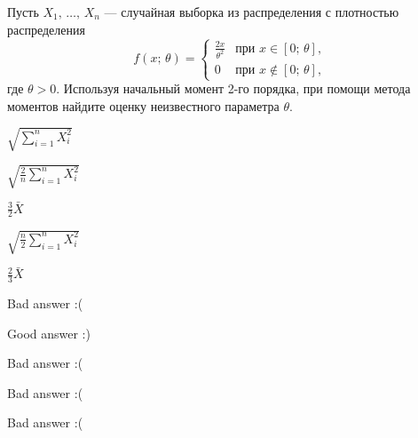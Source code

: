 
\begin{question}
Пусть \(X_1, \, \ldots, \, X_n\) --- случайная выборка из распределения
с плотностью распределения \[
    f(x; \, \theta) = \begin{cases}
                          \frac{2x}{\theta^2} & \text{при } x \in [0;\,\theta], \\
                          0 & \text{при } x \not\in [0;\,\theta],
                      \end{cases}
\] где \(\theta > 0\). Используя начальный момент 2-го порядка, при
помощи метода моментов найдите оценку неизвестного параметра \(\theta\).
\begin{answerlist}
  \item \(\sqrt{\sum_{i=1}^{n}X_i^2}\)
  \item \(\sqrt{\tfrac{2}{n}\sum_{i=1}^{n}X_i^2}\)
  \item \(\tfrac{3}{2}\bar{X}\)
  \item \(\sqrt{\tfrac{n}{2}\sum_{i=1}^{n}X_i^2}\)
  \item \(\tfrac{2}{3}\bar{X}\)
\end{answerlist}
\end{question}

\begin{solution}
\begin{answerlist}
  \item Bad answer :(
  \item Good answer :)
  \item Bad answer :(
  \item Bad answer :(
  \item Bad answer :(
\end{answerlist}
\end{solution}

